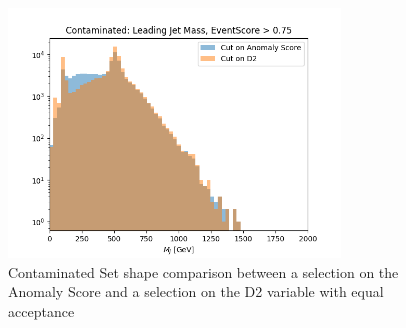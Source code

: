 \documentclass[12pt, a4paper]{article}
\begin{document}
\begin{figure}[H]
	\begin{center}
		\includegraphics[width=250pt]{imgs/2Prong_Contaminated_10p0_J_Mass_EventScore0p75_Multi_D2Comp.png}
	\end{center}
	\caption{Contaminated Set shape comparison between a selection on the Anomaly Score and a selection on the D2 variable with equal acceptance}
	\label{fig:d2_comp}
\end{figure}

\end{document}
